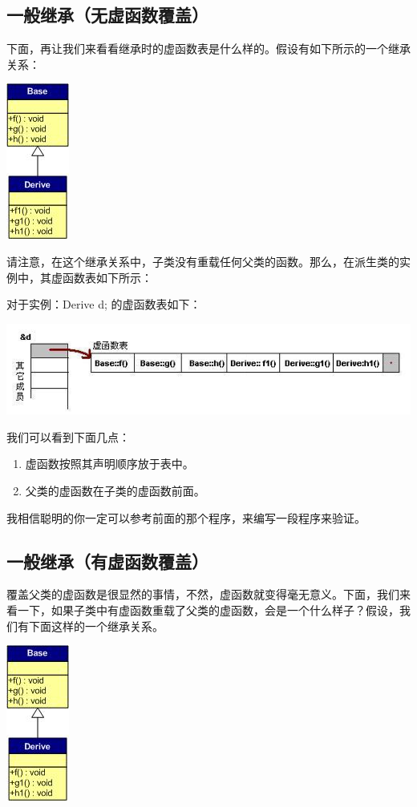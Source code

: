 \documentclass{article}
\begin{document}
\begin{CJK}{UTF8}{gbsn}
\subsection{一般继承（无虚函数覆盖）}
下面，再让我们来看看继承时的虚函数表是什么样的。假设有如下所示的一个继承关系：

\includegraphics{m1.jpg}

请注意，在这个继承关系中，子类没有重载任何父类的函数。那么，在派生类的实例中，其虚函数表如下所示：
 
对于实例：Derive d; 的虚函数表如下：

\includegraphics{m2.JPG}

我们可以看到下面几点：
\begin{enumerate}
\item 虚函数按照其声明顺序放于表中。
\item 父类的虚函数在子类的虚函数前面。
\end{enumerate}
我相信聪明的你一定可以参考前面的那个程序，来编写一段程序来验证。

\subsection{一般继承（有虚函数覆盖）}

覆盖父类的虚函数是很显然的事情，不然，虚函数就变得毫无意义。下面，我们来看一下，如果子类中有虚函数重载了父类的虚函数，会是一个什么样子？假设，我们有下面这样的一个继承关系。

\includegraphics{m3.jpg}


\end{CJK}
\end{document}

